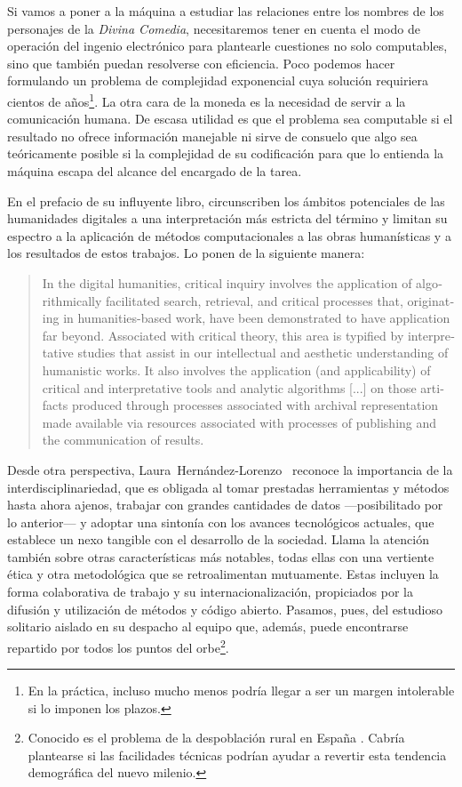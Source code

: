 Si vamos a poner a la máquina a estudiar las relaciones entre los nombres de los personajes de la \textit{Divina Comedia}, necesitaremos tener en cuenta el modo de operación del ingenio electrónico para plantearle cuestiones no solo computables, sino  que también puedan resolverse con eficiencia. Poco podemos hacer formulando un problema de complejidad exponencial cuya solución requiriera cientos de años\footnote{En la práctica, incluso mucho menos podría llegar a ser un margen intolerable si lo imponen los plazos.}. La otra cara de la moneda es la necesidad de servir a la comunicación humana. De escasa utilidad es que el problema sea computable si el resultado no ofrece información manejable ni sirve de consuelo que algo sea teóricamente posible si la complejidad de su codificación para que lo entienda la máquina escapa del alcance del encargado de la tarea.

En el prefacio de su influyente libro, \citeauthor{schreibman2004a} circunscriben los ámbitos potenciales de las humanidades digitales a una interpretación más estricta del término y limitan su espectro a la aplicación de métodos computacionales a las obras humanísticas y a los resultados de estos trabajos. Lo ponen de la siguiente manera:

\blockquote{\begin{english}In the digital humanities, critical inquiry involves the application of algorithmically facilitated search, retrieval, and critical processes that, originating in humanities-based work, have been demonstrated to have application far beyond. Associated with critical theory, this area is typified by interpretative studies that assist in our intellectual and aesthetic understanding of humanistic works. It also involves the application (and applicability) of critical and interpretative tools and analytic algorithms [...] on those artifacts produced through processes associated with archival representation made available via resources associated with processes of publishing and the communication of results.\end{english} \parencite[xxv]{schreibman2004a}}

Desde otra perspectiva, Laura~Hernández-Lorenzo~\parencite*{hernandez2022} reconoce la importancia de la interdisciplinariedad, que es obligada al tomar prestadas herramientas y métodos hasta ahora ajenos, trabajar con grandes cantidades de datos —posibilitado por lo anterior— y adoptar una sintonía con los avances tecnológicos actuales, que establece un nexo tangible con el desarrollo de la sociedad. Llama la atención también sobre otras características más notables, todas ellas con una vertiente ética y otra metodológica que se retroalimentan mutuamente. Estas incluyen la forma colaborativa de trabajo y su internacionalización, propiciados por la difusión y utilización de métodos y código abierto. Pasamos, pues, del estudioso solitario aislado en su despacho al equipo que, además, puede encontrarse repartido por todos los puntos del orbe\footnote{Conocido es el problema de la despoblación rural en España \parencite{esteban2022}. Cabría plantearse si las facilidades técnicas podrían ayudar a revertir esta tendencia demográfica del nuevo milenio.}.

